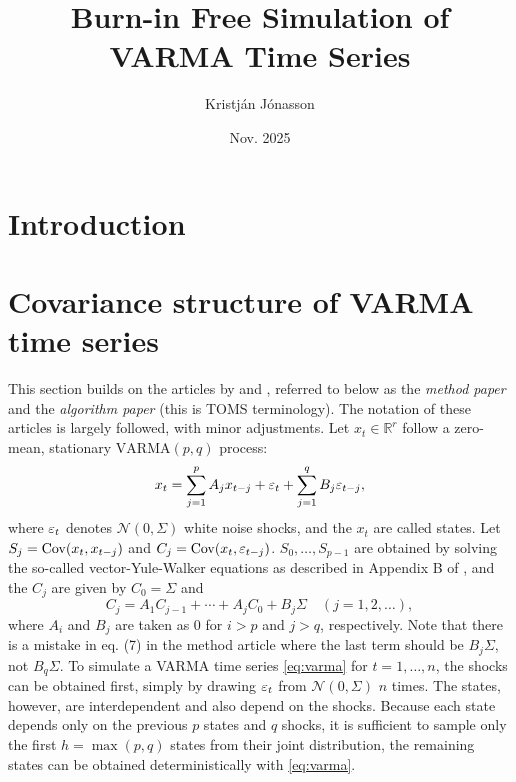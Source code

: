 \documentclass[a4paper,12pt]{extarticle} %
\author{Kristján Jónasson}
\date{Nov. 2025}
\title{Burn-in Free Simulation of VARMA Time Series}
\begin{document}
\maketitle
\section{Introduction}
\section{Covariance structure of VARMA time series}
This section builds on the articles by \citet{jonasson2008method} and
\citet{jonasson2008algorithm}, referred to below as the \emph{method paper} and the
\emph{algorithm paper} (this is TOMS terminology). The notation of these
articles is largely followed, with minor adjustments. Let $x_t \in
\mathbb{R}^r$ follow a zero-mean, stationary $\mathrm{VARMA}(p,q)$ process:
%
\begin{equation}
  \label{eq:varma}
  x_t
  = \sum_{j=1}^{p} A_j x_{t-j}
  + \varepsilon_t
  + \sum_{j=1}^{q} B_j \varepsilon_{t-j},
\end{equation}
%
where $\varepsilon_t$ denotes $\mathcal{N}(0, \Sigma)$ white noise shocks, and the $x_t$
are called states. Let $S_j = \operatorname{Cov}(x_t, x_{t-j})$ and $C_j = \operatorname{Cov}(x_t,
\varepsilon_{t-j})$. $S_0,\ldots,S_{p-1}$ are obtained by solving the so-called
vector-Yule-Walker equations as described in Appendix B of
\citet{jonasson2006efficient}, and the $C_j$ are given by $C_0 = \Sigma$ and
% 
\begin{equation}
  C_j = A_1C_{j-1} + \cdots + A_j C_0 + B_j\Sigma \quad (j=1,2,\ldots),
\end{equation}
%
where $A_i$ and $B_j$ are taken as $0$ for $i>p$ and $j>q$, respectively. Note
that there is a mistake in eq. (7) in the method article where the last term
should be $B_j\Sigma$, not $B_q\Sigma$. To simulate a VARMA time series
\eqref{eq:varma} for $t=1,\ldots,n$, the shocks can be obtained first, simply by
drawing $\varepsilon_t$ from $\mathcal{N}(0, \Sigma)$ $n$ times. The states, however,
are interdependent and also depend on the shocks. Because each state depends
only on the previous $p$ states and $q$ shocks, it is sufficient to sample
only the first $h = \max(p,q)$ states from their joint distribution, the
remaining states can be obtained deterministically with \eqref{eq:varma}.
\end{document}
